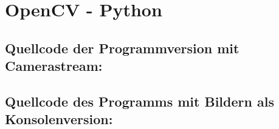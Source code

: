 
\section{OpenCV - Python}
\label{sec:OpenCV}

\subsection{Quellcode der Programmversion mit Camerastream:}
\lstset{language=Python}


\subsection{Quellcode des Programms mit Bildern als Konsolenversion:}
\lstset{language=Python}

